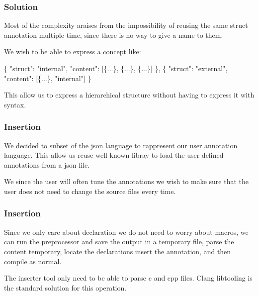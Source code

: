 \documentclass{beamer}
\begin{document}
\begin{frame}[fragile]
	\frametitle{Solution}
	\begin{block}{}
	Most of the complexity araises from the impossibility of reusing the same struct annotation multiple time, since there is no way to give a name to them.

	We wish to be able to express a concept like:
	\end{block}

	\begin{alertblock}{}
	\begin{semiverbatim}	
		\{
		\quad "struct": "internal",
		\quad "content": [\{...\}, \{...\}, \{...\}]
		\},
		\{
		\quad "struct": "external",
		\quad "content": [\{...\}, "internal"]
		\}
	\end{semiverbatim}
	\end{alertblock}

	\begin{block}{}
	This allow us to express a hierarchical structure without having to express it with syntax.
	\end{block}

\end{frame}
\begin{frame}[fragile]
	\frametitle{Insertion}
	\begin{block}{}
	We decided to subset of the json language to rappresent our user annotation language.
	This allow us reuse well known libray to load the user defined annotations from a json file.
	\end{block}
	\begin{block}{}
		We since the user will often tune the annotations we wish to make sure that the user does not need to change the source files every time. 
	\end{block}

\end{frame}
\begin{frame}[fragile]
	\frametitle{Insertion}
	\begin{block}{}
		Since we only care about declaration we do not need to worry about macros, we can run the preprocessor and save the output in a temporary file, parse the content temporary, locate the declarations insert the annotation, and then compile as normal. 
	\end{block}
	
	\begin{block}{}
		The inserter tool only need to be able to parse c and cpp files. Clang libtooling is the standard solution for this operation.
	\end{block}

\end{frame}
\end{document}
